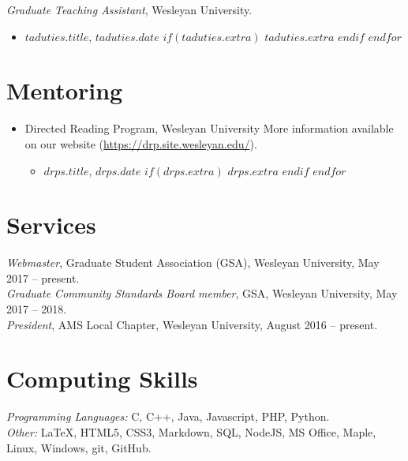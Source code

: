 \documentclass[10pt]{res}
\newcommand{\bigsection}[1]{\section{\large{#1}}}
\begin{document}
\begin{resume}
{\sl Graduate Teaching Assistant}, Wesleyan University. \\
\begin{itemize}
  $for(taduties)$
    \item $taduties.title$, $taduties.date$
    $if(taduties.extra)$
      \subitem $taduties.extra$
    $endif$
  $endfor$
\end{itemize}

\bigsection{Mentoring}

\begin{itemize}
  \item Directed Reading Program, Wesleyan University
  \subitem More information available on our website (\href{https://drp.site.wesleyan.edu/}{https://drp.site.wesleyan.edu/}).
  \begin{itemize}
    $for(drps)$
      \item $drps.title$, $drps.date$
      $if(drps.extra)$
        \subitem $drps.extra$
      $endif$
    $endfor$
  \end{itemize}
\end{itemize}

\bigsection{Services}

{\sl Webmaster}, Graduate Student Association (GSA), Wesleyan University, May 2017 -- present. \\
{\sl Graduate Community Standards Board member}, GSA, Wesleyan University, May 2017 -- 2018. \\
{\sl President}, AMS Local Chapter, Wesleyan University, August 2016 -- present. \\

\bigsection{Computing Skills}

{\sl Programming Languages: }
C, C++, Java, Javascript, PHP, Python. \\
{\sl Other: }
LaTeX, HTML5, CSS3, Markdown,
SQL, NodeJS,
MS Office, Maple,
Linux, Windows,
git, GitHub.

\end{resume}
\end{document}
